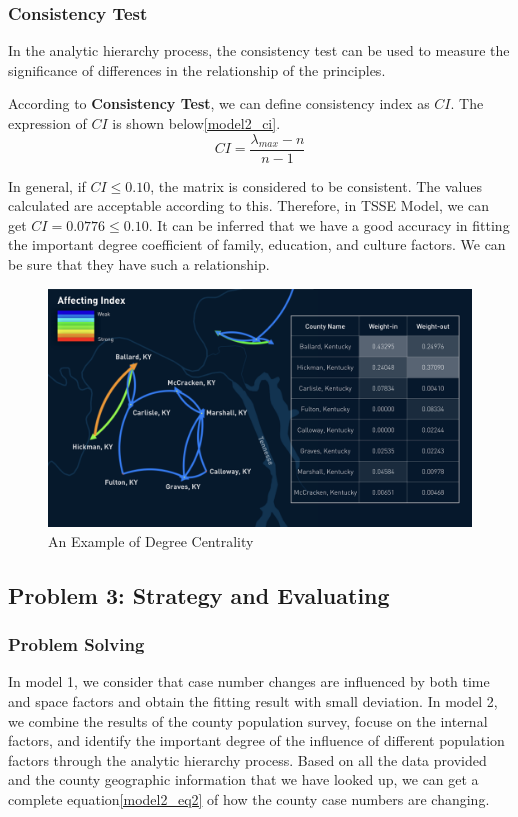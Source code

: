 \documentclass{mcmthesis}
\begin{document}
\subsubsection{Consistency Test}
In the analytic hierarchy process, the consistency test can be used to measure the significance of differences in the relationship of the principles. 

According to \textbf{Consistency Test}, we can define consistency index as $CI$. The expression of $CI$ is shown below\eqref{model2_ci}.
\begin{equation}
CI = \frac{\lambda_{max}-n}{n-1}
\label{model2_ci}
\end{equation}

In general, if $CI\le0.10$, the matrix is considered to be consistent. The values calculated are acceptable according to this.
Therefore, in TSSE Model, we can get $CI=0.0776\le0.10$. It can be inferred that we have a good accuracy in fitting the important degree coefficient of family, education, and culture factors. We can be sure that they have such a relationship.

\begin{figure}[h]
	\centering
	\includegraphics[width=15cm]{figure-release/Model3.EdgeWeight.png}
	\caption{An Example of Degree Centrality}\label{model3_ew}
\end{figure}

\subsection{Problem 3: Strategy and Evaluating}
\subsubsection{Problem Solving}
In model 1, we consider that case number changes are influenced by both time and space factors and obtain the fitting result with small deviation. In model 2, we combine the results of the county population survey, focuse on the internal factors, and identify the important degree of the influence of different population factors through the analytic hierarchy process. Based on all the data provided and the county geographic information that we have looked up, we can get a complete equation\eqref{model2_eq2} of how the county case numbers are changing.
\end{document}
